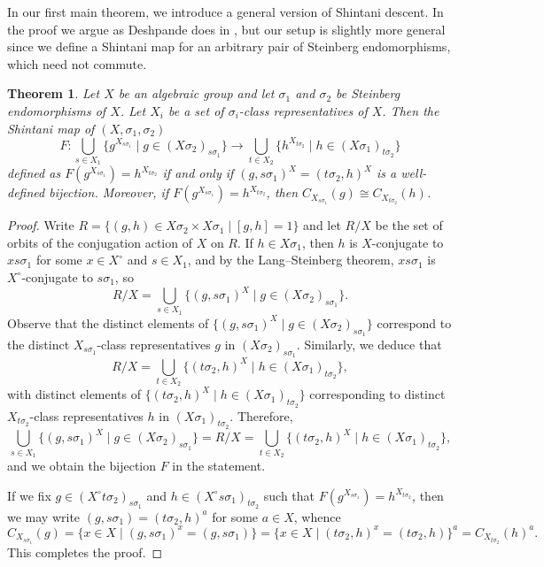 \documentclass[11pt]{article}
\numberwithin{equation}{section}
\theoremstyle{shdefinition}
\theoremstyle{shplain}
\newtheorem{theorem}[definition]{Theorem}
\newcommand{\s}{\sigma}
\newcommand{\<}{\langle}
\renewcommand{\>}{\rangle}
\renewcommand{\:}{\colon}
\begin{document}
In our first main theorem, we introduce a general version of Shintani descent. In the proof we argue as Deshpande does in \cite{ref:Deshpande16}, but our setup is slightly more general since we define a Shintani map for an arbitrary pair of Steinberg endomorphisms, which need not commute.

\begin{theorem} \label{thm:shintani}
Let $X$ be an algebraic group and let $\s_1$ and $\s_2$ be Steinberg endomorphisms of $X$. Let $X_i$ be a set of $\s_i$-class representatives of $X$. Then the \emph{Shintani map} of $(X,\s_1,\s_2)$
\[
F\:\bigcup_{s \in X_1} \{ g^{X_{s\s_1}} \mid g \in (X\s_2)_{s\s_1} \} \to \bigcup_{t \in X_2} \{ h^{X_{t\s_2}} \mid h \in (X\s_1)_{t\s_2} \}
\]
defined as $F(g^{X_{s\s_1}}) = h^{X_{t\s_2}}$ if and only if $(g,s\s_1)^X = (t\s_2,h)^X$ is a well-defined bijection. Moreover, if $F(g^{X_{s\s_1}}) = h^{X_{t\s_2}}$, then $C_{X_{s\s_1}}(g) \cong C_{X_{t\s_2}}(h)$.
\end{theorem}

\begin{proof}
Write $R = \{ (g,h) \in X\s_2 \times X\s_1 \mid [g,h]=1 \}$ and let $R/X$ be the set of orbits of the conjugation action of $X$ on $R$. If $h \in X\s_1$, then $h$ is $X$-conjugate to $xs\s_1$ for some $x \in X^\circ$ and $s \in X_1$, and by the Lang--Steinberg theorem, $xs\s_1$ is $X^\circ$-conjugate to $s\s_1$, so
\[
R/X = \bigcup_{s \in X_1} \{ (g, s\s_1)^X \mid g \in (X\s_2)_{s\s_1} \}.
\]
Observe that the distinct elements of $\{ (g, s\s_1)^X \mid g \in (X\s_2)_{s\s_1} \}$ correspond to the distinct $X_{s\s_1}$-class representatives $g$ in $(X\s_2)_{s\s_1}$. Similarly, we deduce that
\[
R/X = \bigcup_{t \in X_2} \{ (t\s_2, h)^X \mid h \in (X\s_1)_{t\s_2} \},
\]
with distinct elements of $\{ (t\s_2, h)^X \mid h \in (X\s_1)_{t\s_2} \}$ corresponding to distinct $X_{t\s_2}$-class representatives $h$ in $(X\s_1)_{t\s_2}$. Therefore,
\[
\bigcup_{s \in X_1} \{ (g, s\s_1)^X \mid g \in (X\s_2)_{s\s_1} \} = R/X = \bigcup_{t \in X_2} \{ (t\s_2, h)^X \mid h \in (X\s_1)_{t\s_2} \},
\]
and we obtain the bijection $F$ in the statement.

If we fix $g \in (X^\circ t\s_2)_{s\s_1}$ and $h \in (X^\circ s\s_1)_{t\s_2}$ such that $F(g^{X_{s\s_1}}) = h^{X_{t\s_2}}$, then we may write $(g,s\s_1) = (t\s_2,h)^a$ for some $a \in X$, whence
\[
C_{X_{s\s_1}}(g) = \{ x \in X \mid (g,s\s_1)^x = (g,s\s_1) \} = \{ x \in X \mid (t\s_2,h)^x = (t\s_2,h) \}^a = C_{X_{t\s_2}}(h)^a.
\]
This completes the proof.
\end{proof}
\end{document}
